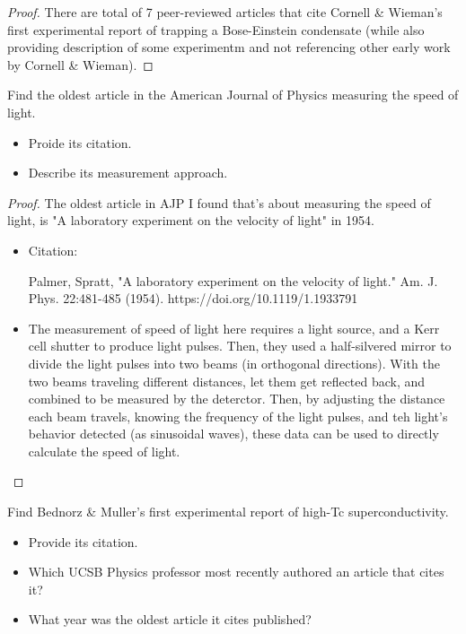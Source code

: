 \documentclass{article}
\begin{document}
\begin{proof}
    There are total of 7 peer-reviewed articles that cite Cornell \& Wieman's first experimental report of trapping a Bose-Einstein condensate (while also providing description of some experimentm and not referencing other early work by Cornell \& Wieman).
\end{proof}

\hfil

\begin{ques}
    Find the oldest article in the American Journal of Physics measuring the speed of light.
    \begin{itemize}
        \item[a.] Proide its citation.
        \item[b.] Describe its measurement approach. 
    \end{itemize}
\end{ques}

\begin{proof}
    The oldest article in AJP I found that's about measuring the speed of light, is "A laboratory experiment on the velocity of light" in 1954.

    \begin{itemize}
        \item[a.] Citation:
        
        \hfil

        Palmer, Spratt, "A laboratory experiment on the velocity of light." Am. J. Phys. 22:481-485 (1954). https://doi.org/10.1119/1.1933791

        \hfil

        \item[b.] The measurement of speed of light here requires a light source, and a Kerr cell shutter to produce light pulses. Then, they used a half-silvered mirror to divide the light pulses into two beams (in orthogonal directions). With the two beams traveling different distances, let them get reflected back, and combined to be measured by the deterctor. Then, by adjusting the distance each beam travels, knowing the frequency of the light pulses, and teh light's behavior detected (as sinusoidal waves), these data can be used to directly calculate the speed of light.
    \end{itemize}
\end{proof}

\hfil

\begin{ques}
    Find Bednorz \& Muller’s first experimental report of high-Tc superconductivity.
    \begin{itemize}
        \item[a.] Provide its citation.
        \item[b.] Which UCSB Physics professor most recently authored an article that cites it?
        \item[c.] What year was the oldest article it cites published?  
    \end{itemize}
\end{ques}
\end{document}
